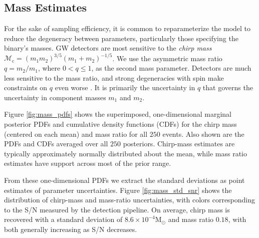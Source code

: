 \subsection{Mass Estimates}\label{sec:mass}

For the sake of sampling efficiency, it is common to reparameterize the model to reduce the degeneracy between parameters, particularly those specifying the binary's masses.  GW detectors are most sensitive to the \emph{chirp mass} $\mathcal{M}_\mathrm{c} = (m_1 m_2)^{3/5} (m_1 + m_2)^{-1/5}$.  We use the asymmetric mass ratio $q = m_2/m_1$, where $0 < q \leq 1$, as the second mass parameter.  Detectors are much less sensitive to the mass ratio, and strong degeneracies with spin make constraints on $q$ even worse \citep{Cutler_1994}.  It is primarily the uncertainty in $q$ that governs the uncertainty in component masses $m_1$ and $m_2$.

Figure \ref{fig:mass_pdfs} shows the superimposed, one-dimensional marginal posterior PDFs and cumulative density functions (CDFs) for the chirp mass (centered on each mean) and mass ratio for all $250$ events.  Also shown are the PDFs and CDFs averaged over all $250$ posteriors. Chirp-mass estimates are typically approximately normally distributed about the mean, while mass ratio estimates have support across most of the prior range.

From these one-dimensional PDFs we extract the standard deviations as point estimates of parameter uncertainties.  Figure \ref{fig:mass_std_snr} shows the distribution of chirp-mass and mass-ratio uncertainties, with colors corresponding to the S/N measured by the detection pipeline. On average, chirp mass is recovered with a standard deviation of $8.6 \times 10^{-4} \mathrm{M}_\odot$ and mass ratio $0.18$, with both generally increasing as S/N decreases.
  
  
